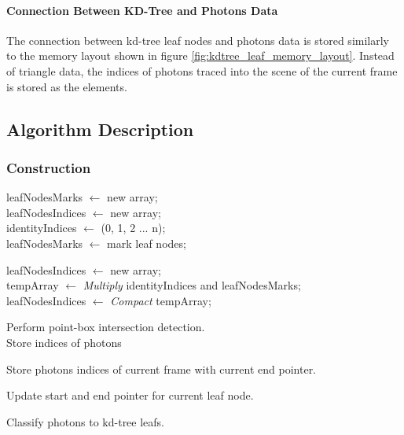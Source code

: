 \paragraph{Connection Between KD-Tree and Photons Data} 

The connection between kd-tree leaf nodes and photons data is stored similarly to the memory layout shown in figure \ref{fig:kdtree_leaf_memory_layout}. Instead of triangle data, the indices of photons traced into the scene of the current frame is stored as the elements. 


\subsection{Algorithm Description} 

\subsubsection{Construction}  

\begin{spacing}{1.3} 

\begin{algorithm}[H]
	\SetAlgoLined

	leafNodesMarks 	\(\leftarrow\) new array; \\
	leafNodesIndices 	\(\leftarrow\) new array; \\
	identityIndices 	\(\leftarrow\) (0, 1, 2 ... n); \\ 

	 {
		leafNodesMarks \(\leftarrow\) mark leaf nodes; \\
	}

	leafNodesIndices \( \leftarrow \) new array;	 \\
	tempArray \(\leftarrow\) \emph{Multiply} identityIndices and leafNodesMarks; \\
	leafNodesIndices \( \leftarrow \) \emph{Compact} tempArray; 
	 
	 {
		 {
			Perform point-box intersection detection. \\ 
			Store indices of photons 
		}
	}
	
	 {
		 {
			Store photons indices of current frame with current end pointer. 
		}

		Update start and end pointer for current leaf node.
	}
	
	\caption{Classify photons to kd-tree leafs. } 	
	\label{algo:build_kdleaf_photons} 
\end{algorithm}

\end{spacing}

